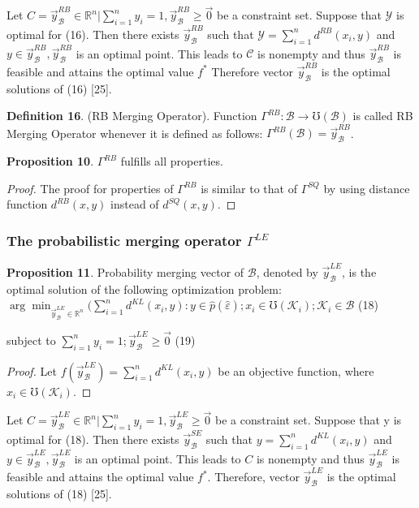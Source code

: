 \documentclass[]{iosart2c}
\begin{document}
  Let $C = { \vec{y}^{RB}_\mathcal{B} \in \mathbb{R}^n|\sum^n_{i=1} y_i = 1, \vec{y}^{RB}_\mathcal{B} \geq \vec{0} }$ be
  a constraint set. Suppose that $\mathcal{Y}$ is optimal for (16).
  Then there exists $\vec{y}^{RB}_\mathcal{B}$ such that $\mathcal{Y} = \sum^n_{i=1} d^{RB}(x_i, y)$
  and $y \in \vec{y}^{RB}_\mathcal{B} , \vec{y}^{RB}_\mathcal{B}$ is an optimal point. This leads to $\mathcal{C}$
  is nonempty and thus $\vec{y}^{RB}_\mathcal{B}$ is feasible and attains the
  optimal value $f^*$ Therefore vector $\vec{y}^{RB}_\mathcal{B}$ is the optimal
  solutions of (16) [25].

  \textbf{Definition 16}. (RB Merging Operator). Function
  $\Gamma^{RB} : \mathcal{B} \to \mho(\mathcal{B})$ is called RB Merging Operator
  whenever it is defined as follows: $\Gamma^{RB}(\mathcal{B}) = \vec{y}^{RB}_\mathcal{B}$.

  \textbf{Proposition 10}. $\Gamma^{RB}$ fulfills all properties.

  \begin{proof}
    The proof for properties of $\Gamma^{RB}$ is similar
    to that of $\Gamma^{SQ}$ by using distance function $d^{RB}(x, y)$
    instead of $d^{SQ}(x, y)$.
  \end{proof}

  \subsubsection{The probabilistic merging operator $\Gamma^{LE}$}

  \textbf{Proposition 11}. Probability merging vector of $\mathcal{B}$,
  denoted by $\vec{y}^{LE}_\mathcal{B}$, is the optimal solution of the following optimization problem:
  $\arg \min_{\vec{y}^{LE}_\mathcal{B} \in \mathbb{R}^n} (\sum^n_{i=1} d^{KL}(x_i, y) :
  y \in \hat{p}(\hat{\varepsilon}); x_i \in \mho(\mathcal{K}_i);\mathcal{K}_i \in \mathcal{B}$ (18)

  subject to $\sum^n_{i=1} y_i = 1; \vec{y}^{LE}_\mathcal{B} \geq \vec{0}$ (19)

  \begin{proof}
    Let $f(\vec{y}^{LE}_\mathcal{B} ) = \sum^n_{i=1} d^{KL}(x_i, y)$ be an objective function, where $x_i \in \mho(\mathcal{K}_i)$.
  \end{proof}

  Let $C = {\vec{y}^{LE}_\mathcal{B} \in \mathbb{R}^n|\sum^n_{i=1} y_i = 1, \vec{y}^{LE}_\mathcal{B} \geq \vec{0} }$ be a
  constraint set. Suppose that y is optimal for (18).
  Then there exists $\vec{y}^{SE}_\mathcal{B}$ such that $y = \sum^n_{i=1} d^{KL}(x_i, y)$
  and $y \in \vec{y}^{LE}_\mathcal{B} , \vec{y}^{LE}_\mathcal{B}$ is an optimal point. This leads to
  $C$ is nonempty and thus $\vec{y}^{LE}_\mathcal{B}$ is feasible and attains
  the optimal value $f^*$. Therefore, vector $\vec{y}^{LE}_\mathcal{B}$ is the
  optimal solutions of (18) [25].
\end{document}
